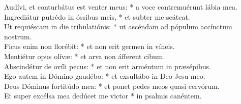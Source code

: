 {	Audívi, et conturbátus est venter meus: * a voce contremuérunt lábia mea. \\
	Ingrediátur putrédo in óssibus meis, * et subter me scáteat. \\
	Ut requiéscam in die tribulatiónis: * ut ascéndam ad pópulum accínctum nostrum. \\
	Ficus enim non florébit: * et non erit germen in víneis. \\
	Mentiétur opus olívæ: * et arva non áfferent cibum. \\
	Abscindétur de ovíli pecus: * et non erit arméntum in præsépibus. \\
	Ego autem in Dómino gaudébo: * et exsultábo in Deo Jesu meo. \\
	Deus Dóminus fortitúdo mea: * et ponet pedes meos quasi cervórum. \\
	Et super excélsa mea dedúcet me victor * in psalmis canéntem. \\
}

